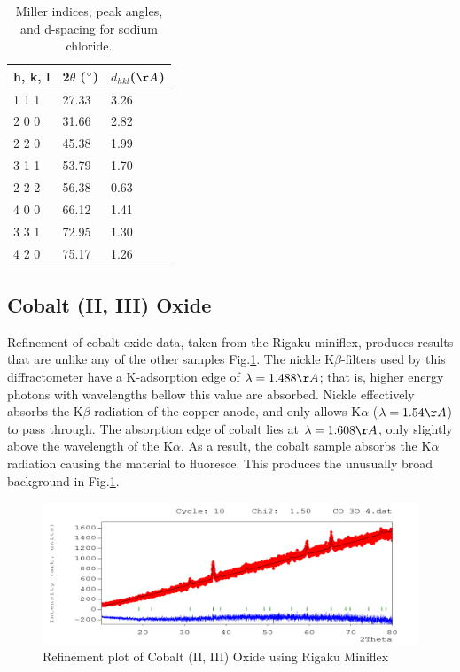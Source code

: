 \documentclass[12pt]{article}
\begin{document}
\begin{table}[h!]\centering
\begin{tabular}{ |p{3cm}|p{3cm}|p{3cm}|}
 \hline
  h, k, l & 2$\theta$ ($\degree$)& $d_{hkl}$($\AA$)\\
 \hline
 1 1 1 &  27.33 & 3.26\\
 \hline
 2 0 0 &  31.66 & 2.82\\
 \hline
 2 2 0 &  45.38 & 1.99\\
 \hline
 3 1 1 &  53.79 & 1.70\\
 \hline
 2 2 2 &  56.38 & 0.63\\
 \hline
 4 0 0 &  66.12 & 1.41\\
 \hline
 3 3 1 &  72.95 & 1.30\\
 \hline
 4 2 0 &  75.17 & 1.26\\
 \hline
\end{tabular}
\def\sym#1{\ifmmode^{#1}\else\(^{#1}\)\fi}
\caption{Miller indices, peak angles, and d-spacing for sodium chloride.}\label{tab:NaCl_miller}
\end{table}



\newpage
\subsection{Cobalt (II, III) Oxide}
Refinement of cobalt oxide data, taken from the Rigaku miniflex, produces results that are unlike any of the other samples Fig.\ref{fig:co3o4}.  The nickle K$\beta$-filters used by this diffractometer have a K-adsorption edge of $\lambda = 1.488\AA$; that is, higher energy photons with wavelengths bellow this value are absorbed. Nickle effectively absorbs the K$\beta$ radiation of the copper anode, and only allows K$\alpha$ ($\lambda = 1.54\AA$) to pass through. The absorption edge of cobalt lies at $\lambda = 1.608\AA$, only slightly above the wavelength of the K$\alpha$. As a result, the cobalt sample absorbs the K$\alpha$ radiation causing the material to fluoresce. This produces the unusually broad background in Fig.\ref{fig:co3o4}.
\begin{figure}[h!]
 \quad \includegraphics[width=1\textwidth]{Co3O4_refinement}
\caption{Refinement plot of Cobalt (II, III) Oxide using Rigaku Miniflex}
\label{fig:co3o4}
\end{figure}
\end{document}
